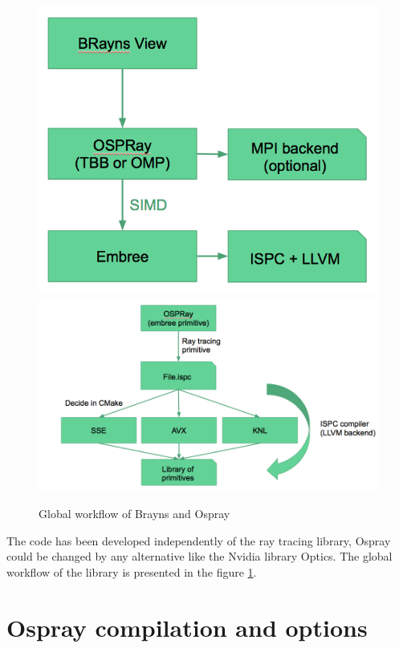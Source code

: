 \documentclass[11pt]{amsart}
\begin{document}
\begin{center}
\begin{figure}[h]
\includegraphics[scale=0.27]{workflowbrayns}
\includegraphics[scale=0.27]{SIMD}
\caption{Global workflow of Brayns  and Ospray \label{workflow}}
\end{figure}
\end{center}

The code has been developed independently of the ray tracing library, Ospray could be changed by any alternative like the Nvidia 
library Optics. The global workflow of the library is presented in the figure \ref{workflow}.

\section{Ospray compilation and options}
\end{document}
